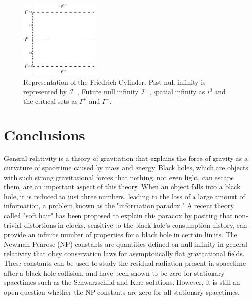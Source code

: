 \begin{figure}[h]
	\centering \includegraphics[width =0.35\textwidth]{friedrich cylinder.pdf}
    \caption{Representation of the Friedrich Cylinder. Past null infinity is represented by
    $\mathscr{I}^{-}$, Future null infinity $\mathscr{I}^{+}$, spatial infinity as $i^{0}$ and the critical sets as $I^{+}$ and $I^{-}$.}
\end{figure}

\section{Conclusions}
\label{sec:conclusions}

General relativity is a theory of gravitation that explains the force of gravity as a curvature of spacetime caused by mass and energy. Black holes, which are objects with such strong gravitational forces that nothing, not even light, can escape them, are an important aspect of this theory. When an object falls into a black hole, it is reduced to just three numbers, leading to the loss of a large amount of information, a problem known as the "information paradox." A recent theory called "soft hair" has been proposed to explain this paradox by positing that non-trivial distortions in clocks, sensitive to the black hole's consumption history, can provide an infinite number of properties for a black hole in certain limits. The Newman-Penrose (NP) constants are quantities defined on null infinity in general relativity that obey conservation laws for asymptotically flat gravitational fields. These constants can be used to study the residual radiation present in spacetime after a black hole collision, and have been shown to be zero for stationary spacetimes such as the Schwarzschild and Kerr solutions. However, it is still an open question whether the NP constants are zero for all stationary spacetimes. \\

